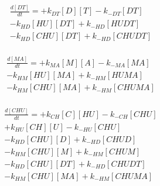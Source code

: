 \begin{equation}
\begin{split}
\frac{d[DT]}{dt} =    + k_{DT}[D][T]    - k_{-DT}[DT]     \\%
                      - k_{HD}[HU][DT]  + k_{-HD}[HUDT]   \\%
                      - k_{HD}[CHU][DT] + k_{-HD}[CHUDT]  \\%
\end{split}
\end{equation}

\begin{equation}
\begin{split}
\frac{d[MA]}{dt} =    + k_{MA}[M][A]    - k_{-MA}[MA]     \\%
                      - k_{HM}[HU][MA]  + k_{-HM}[HUMA]   \\%
                      - k_{HM}[CHU][MA] + k_{-HM}[CHUMA]  \\%
\end{split}
\end{equation}

\begin{equation}
\begin{split}
\frac{d[CHU]}{dt} =   + k_{CH}[C][HU]   - k_{-CH}[CHU]    \\%
                      + k_{HU}[CH][U]   - k_{-HU}[CHU]    \\%
                      - k_{HD}[CHU][D]  + k_{-HD}[CHUD]   \\%
                      - k_{HM}[CHU][M]  + k_{-HM}[CHUM]   \\%
                      - k_{HD}[CHU][DT] + k_{-HD}[CHUDT]  \\%
                      - k_{HM}[CHU][MA] + k_{-HM}[CHUMA]  \\%
\end{split}
\end{equation}


